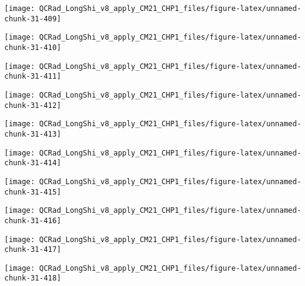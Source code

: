 \documentclass[
  10pt,
  a4paper,oneside]{article}
\begin{document}
\begin{center}\texttt{[image: QCRad\_LongShi\_v8\_apply\_CM21\_CHP1\_files/figure-latex/unnamed-chunk-31-409]} \end{center}

\begin{center}\texttt{[image: QCRad\_LongShi\_v8\_apply\_CM21\_CHP1\_files/figure-latex/unnamed-chunk-31-410]} \end{center}

\begin{center}\texttt{[image: QCRad\_LongShi\_v8\_apply\_CM21\_CHP1\_files/figure-latex/unnamed-chunk-31-411]} \end{center}

\begin{center}\texttt{[image: QCRad\_LongShi\_v8\_apply\_CM21\_CHP1\_files/figure-latex/unnamed-chunk-31-412]} \end{center}

\begin{center}\texttt{[image: QCRad\_LongShi\_v8\_apply\_CM21\_CHP1\_files/figure-latex/unnamed-chunk-31-413]} \end{center}

\begin{center}\texttt{[image: QCRad\_LongShi\_v8\_apply\_CM21\_CHP1\_files/figure-latex/unnamed-chunk-31-414]} \end{center}

\begin{center}\texttt{[image: QCRad\_LongShi\_v8\_apply\_CM21\_CHP1\_files/figure-latex/unnamed-chunk-31-415]} \end{center}

\begin{center}\texttt{[image: QCRad\_LongShi\_v8\_apply\_CM21\_CHP1\_files/figure-latex/unnamed-chunk-31-416]} \end{center}

\begin{center}\texttt{[image: QCRad\_LongShi\_v8\_apply\_CM21\_CHP1\_files/figure-latex/unnamed-chunk-31-417]} \end{center}

\begin{center}\texttt{[image: QCRad\_LongShi\_v8\_apply\_CM21\_CHP1\_files/figure-latex/unnamed-chunk-31-418]} \end{center}
\end{document}
